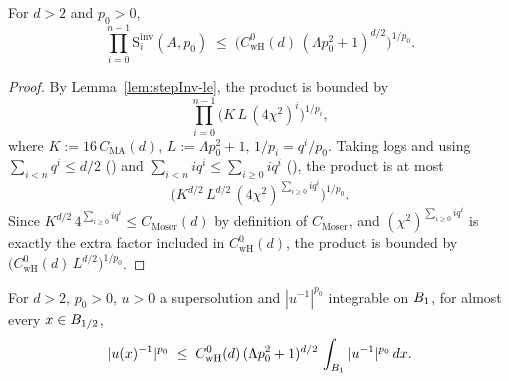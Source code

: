 \begin{lemma}
\label{lem:geom-maj-inv}
\leanok
{}
For $d>2$ and $p_0>0$,
\begin{equation*}
  \prod_{i=0}^{n-1}\mathrm{S}_i^{\mathrm{inv}}(A,p_0)
  \;\leq\;
  \big(C_{\mathrm{wH}}^{0}(d)\,(\Lambda p_0^{2}+1)^{d/2}\big)^{1/p_0}.
\end{equation*}
\end{lemma}

\begin{proof}
\leanok
{}

By Lemma~\ref{lem:stepInv-le}, the product is bounded by
\begin{equation*}
  \prod_{i=0}^{n-1}\big(K\,L\,(4\chi^{2})^{i}\big)^{1/p_i},
\end{equation*}
where $K := 16\,C_{\mathrm{MA}}(d)$, $L := \Lambda p_0^{2}+1$, $1/p_i = q^{i}/p_0$.
Taking logs and using $\sum_{i<n} q^{i} \leq d/2$ ()
and $\sum_{i<n} i q^{i} \leq \sum_{i\geq 0} i q^{i}$
(), the product is at most
\begin{equation*}
  \big(K^{d/2}\,L^{d/2}\,(4\chi^{2})^{\sum_{i\geq 0} i q^{i}}\big)^{1/p_0}.
\end{equation*}
Since $K^{d/2}\,4^{\sum_{i\geq 0} i q^{i}} \leq C_{\mathrm{Moser}}(d)$ by definition
of $C_{\mathrm{Moser}}$, and $(\chi^{2})^{\sum_{i\geq 0} i q^{i}}$ is exactly the
extra factor included in $C_{\mathrm{wH}}^{0}(d)$, the product is bounded by
$\big(C_{\mathrm{wH}}^{0}(d)\,L^{d/2}\big)^{1/p_0}$.
\end{proof}

\begin{theorem}
\label{thm:ae-closeout-inv}
\leanok
{}
For $d>2$, $p_0 > 0$, $u>0$ a supersolution and $|u^{-1}|^{p_0}$ integrable on
$B_{1}$, for almost every $x \in B_{1/2}$,
\begin{equation*}
  |u(x)^{-1}|^{p_0}
  \;\leq\;
  C_{\mathrm{wH}}^{0}(d)\,(\Lambda p_0^{2}+1)^{d/2}\,
  \int_{B_{1}} |u^{-1}|^{p_0}\,dx.
\end{equation*}
\end{theorem}


